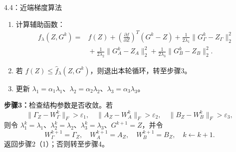 \begin{bookalgorithm}{4.4：近端梯度算法}
\begin{enumerate}
\begin{equation}
\gamma_{ij}^z=\operatorname{sign}(u_{\Gamma ij}^k)
 (|u_{\Gamma ij}^k|-\lambda_1^k)_+,
\quad i,j=1,\ldots,MT,\tag{4.218}
\end{equation}
\begin{equation}
\alpha_{ij}^z=\operatorname{sign}(u_{Aij}^k)
 (|u_{Aij}^k|-\lambda_2^k)_+,
\quad i,j=1,\ldots,MT,\tag{4.219}
\end{equation}
\begin{equation}
\beta_{ij}^z=\operatorname{sign}(u_{Bij}^k)
 (|u_{Bij}^k|-\lambda_3^k)_+,
\quad i=1,\ldots,KT,\ j=1,\ldots,MT,\tag{4.220}
\end{equation}
\begin{equation}
\Gamma_z=(\gamma_{ij}^z)_{MT\times MT},\quad
A_z=(\alpha_{ij}^z)_{MT\times MT},\quad
B_z=(\beta_{ij})_{KT\times MT},\tag{4.221}
\end{equation}
\[
Z_\Gamma=\operatorname{vec}(\Gamma_z),\quad
Z_A=\operatorname{vec}(A_z),\quad Z_B=\operatorname{vec}(B_z).
\]
\item 计算辅助函数：
\[
\begin{aligned}
f_\lambda(Z,G^k)={}&f(Z)
+\left(\frac{\partial f}{\partial Z}\right)^T(G^k-Z)
+\frac{1}{2\lambda_1}\|G_\Gamma^k-Z_\Gamma\|_2^2\\
&{}+\frac{1}{2\lambda_2}\|G_A^k-Z_A\|_2^2
+\frac{1}{2\lambda_3}\|G_B^k-Z_B\|_2^2.
\end{aligned}
\]
\item 若 $f(Z)\le\widehat f_\lambda(Z,G^k)$，则退出本轮循环，转至步骤3。
\item 更新 $\lambda_1=\alpha_1\lambda_1$、$\lambda_2=\alpha_2\lambda_2$、$\lambda_3=\alpha_3\lambda_3$。
\end{enumerate}
\textbf{步骤3：}检查结构参数是否收敛。若
\[
\|\Gamma_Z-W_\Gamma^k\|_F>\varepsilon_1,\quad
\|A_Z-W_A^k\|_F>\varepsilon_2,\quad
\|B_Z-W_B^k\|_F>\varepsilon_3,
\]
则令 $\lambda_1^k=\lambda_1$、$\lambda_2^k=\lambda_2$、$\lambda_3^k=\lambda_3$、$G^{k+1}=Z$，并令
\begin{equation}
W_\Gamma^{k+1}=\Gamma_Z,\quad W_A^{k+1}=A_Z,\quad
W_B^{k+1}=B_Z,\quad k\leftarrow k+1.\tag{4.222}
\end{equation}
返回步骤2（1）；否则转至步骤4。


\end{bookalgorithm}

